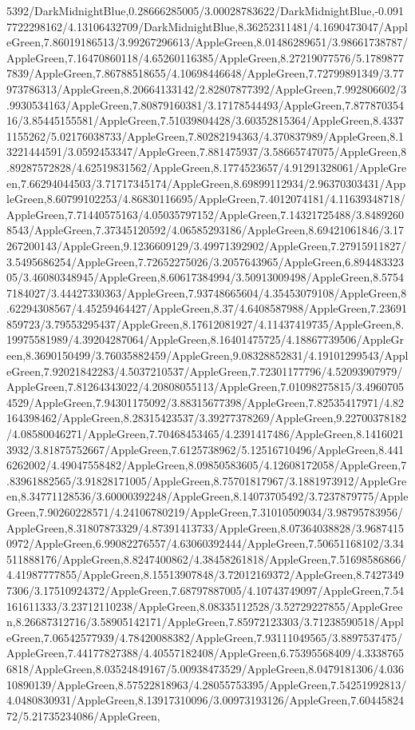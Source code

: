 {\begin{tikzternal}
5392/DarkMidnightBlue,0.28666285005/3.00028783622/DarkMidnightBlue,-0.0917722298162/4.13106432709/DarkMidnightBlue,8.36252311481/4.1690473047/AppleGreen,7.86019186513/3.99267296613/AppleGreen,8.01486289651/3.98661738787/AppleGreen,7.16470860118/4.65260116385/AppleGreen,8.27219077576/5.17898777839/AppleGreen,7.86788518655/4.10698446648/AppleGreen,7.72799891349/3.77973786313/AppleGreen,8.20664133142/2.82807877392/AppleGreen,7.992806602/3.9930534163/AppleGreen,7.80879160381/3.17178544493/AppleGreen,7.87787035416/3.85445155581/AppleGreen,7.51039804428/3.60352815364/AppleGreen,8.43371155262/5.02176038733/AppleGreen,7.80282194363/4.370837989/AppleGreen,8.13221444591/3.0592453347/AppleGreen,7.881475937/3.58665747075/AppleGreen,8.89287572828/4.62519831562/AppleGreen,8.1774523657/4.91291328061/AppleGreen,7.66294044503/3.71717345174/AppleGreen,8.69899112934/2.96370303431/AppleGreen,8.60799102253/4.86830116695/AppleGreen,7.4012074181/4.11639348718/AppleGreen,7.71440575163/4.05035797152/AppleGreen,7.14321725488/3.84892608543/AppleGreen,7.37345120592/4.06585293186/AppleGreen,8.69421061846/3.17267200143/AppleGreen,9.1236609129/3.49971392902/AppleGreen,7.27915911827/3.5495686254/AppleGreen,7.72652275026/3.2057643965/AppleGreen,6.89448332305/3.46080348945/AppleGreen,8.60617384994/3.50913009498/AppleGreen,8.57547184027/3.44427330363/AppleGreen,7.93748665604/4.35453079108/AppleGreen,8.62294308567/4.45259464427/AppleGreen,8.37/4.6408587988/AppleGreen,7.23691859723/3.79553295437/AppleGreen,8.17612081927/4.11437419735/AppleGreen,8.19975581989/4.39204287064/AppleGreen,8.16401475725/4.18867739506/AppleGreen,8.3690150499/3.76035882459/AppleGreen,9.08328852831/4.19101299543/AppleGreen,7.92021842283/4.5037210537/AppleGreen,7.72301177796/4.52093907979/AppleGreen,7.81264343022/4.20808055113/AppleGreen,7.01098275815/3.49607054529/AppleGreen,7.94301175092/3.88315677398/AppleGreen,7.82535417971/4.82164398462/AppleGreen,8.28315423537/3.39277378269/AppleGreen,9.22700378182/4.08580046271/AppleGreen,7.70468453465/4.2391417486/AppleGreen,8.14160213932/3.81875752667/AppleGreen,7.6125738962/5.12516710496/AppleGreen,8.4416262002/4.49047558482/AppleGreen,8.09850583605/4.12608172058/AppleGreen,7.83961882565/3.91828171005/AppleGreen,8.75701817967/3.1881973912/AppleGreen,8.34771128536/3.60000392248/AppleGreen,8.14073705492/3.7237879775/AppleGreen,7.90260228571/4.24106780219/AppleGreen,7.31010509034/3.98795783956/AppleGreen,8.31807873329/4.87391413733/AppleGreen,8.07364038828/3.96874150972/AppleGreen,6.99082276557/4.63060392444/AppleGreen,7.50651168102/3.34511888176/AppleGreen,8.8247400862/4.38458261818/AppleGreen,7.51698586866/4.41987777855/AppleGreen,8.15513907848/3.72012169372/AppleGreen,8.74273497306/3.17510924372/AppleGreen,7.68797887005/4.10743749097/AppleGreen,7.54161611333/3.23712110238/AppleGreen,8.08335112528/3.52729227855/AppleGreen,8.26687312716/3.58905142171/AppleGreen,7.85972123303/3.71238590518/AppleGreen,7.06542577939/4.78420088382/AppleGreen,7.93111049565/3.8897537475/AppleGreen,7.44177827388/4.40557182408/AppleGreen,6.75395568409/4.33387656818/AppleGreen,8.03524849167/5.00938473529/AppleGreen,8.0479181306/4.03610890139/AppleGreen,8.57522818963/4.28055753395/AppleGreen,7.54251992813/4.0480830931/AppleGreen,8.13917310096/3.00973193126/AppleGreen,7.6044582472/5.21735234086/AppleGreen,
\end{tikzternal}}
